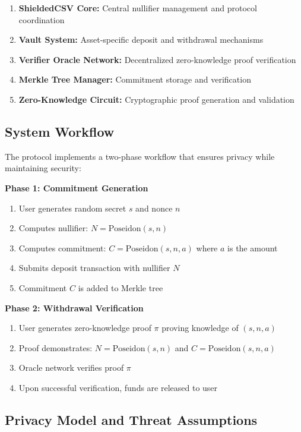\documentclass[11pt,a4paper]{article}
\begin{document}
\begin{enumerate}
    \item \textbf{ShieldedCSV Core:} Central nullifier management and protocol coordination
    \item \textbf{Vault System:} Asset-specific deposit and withdrawal mechanisms
    \item \textbf{Verifier Oracle Network:} Decentralized zero-knowledge proof verification
    \item \textbf{Merkle Tree Manager:} Commitment storage and verification
    \item \textbf{Zero-Knowledge Circuit:} Cryptographic proof generation and validation
\end{enumerate}

\subsection{System Workflow}

The protocol implements a two-phase workflow that ensures privacy while maintaining security:

\textbf{Phase 1: Commitment Generation}
\begin{enumerate}
    \item User generates random secret $s$ and nonce $n$
    \item Computes nullifier: $N = \text{Poseidon}(s, n)$
    \item Computes commitment: $C = \text{Poseidon}(s, n, a)$ where $a$ is the amount
    \item Submits deposit transaction with nullifier $N$
    \item Commitment $C$ is added to Merkle tree
\end{enumerate}

\textbf{Phase 2: Withdrawal Verification}
\begin{enumerate}
    \item User generates zero-knowledge proof $\pi$ proving knowledge of $(s, n, a)$
    \item Proof demonstrates: $N = \text{Poseidon}(s, n)$ and $C = \text{Poseidon}(s, n, a)$
    \item Oracle network verifies proof $\pi$
    \item Upon successful verification, funds are released to user
\end{enumerate}

\subsection{Privacy Model and Threat Assumptions}
\end{document}
